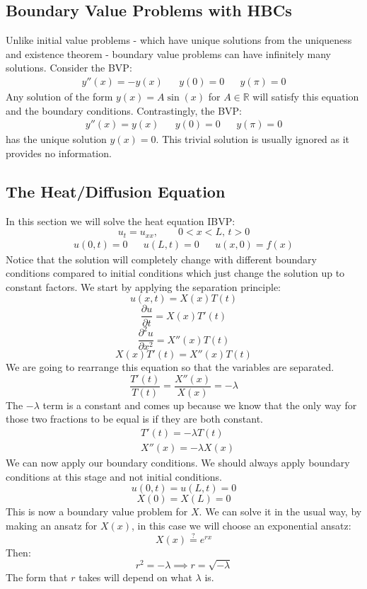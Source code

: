 \documentclass[12pt]{article}
\newcommand{\pf}[2]{\frac{\partial #1}{\partial #2}}
\begin{document}
\subsection{Boundary Value Problems with HBCs}
Unlike initial value problems - which have unique solutions from the uniqueness and existence theorem - boundary value problems can have infinitely many solutions. Consider the BVP:
\begin{align*}
    y''(x)=-y(x) && y(0)=0 && y(\pi)=0
\end{align*}
Any solution of the form \(y(x)=A\sin(x)\) for \(A\in\mathbb{R}\) will satisfy this equation and the boundary conditions. Contrastingly, the BVP:
\begin{align*}
    y''(x)=y(x) && y(0)=0 && y(\pi)=0
\end{align*}
has the unique solution \(y(x)=0\). This trivial solution is usually ignored as it provides no information.
\subsection{The Heat/Diffusion Equation}
In this section we will solve the heat equation IBVP:
\[u_t=u_{xx},\qquad 0<x<L,\,t>0\]
\begin{align*}
    u(0,t)=0 && u(L,t)=0 && u(x,0)=f(x)
\end{align*}
Notice that the solution will completely change with different boundary conditions compared to initial conditions which just change the solution up to constant factors. We start by applying the separation principle:
\[u(x,t)=X(x)T(t)\]
\[\pf{u}{t}=X(x)T'(t)\]
\[\pf{^2u}{x^2}=X''(x)T(t)\]
\[X(x)T'(t)=X''(x)T(t)\]
We are going to rearrange this equation so that the variables are separated.
\[\frac{T'(t)}{T(t)}=\frac{X''(x)}{X(x)}=-\lambda\]
The \(-\lambda\) term is a constant and comes up because we know that the only way for those two fractions to be equal is if they are both constant.
\begin{align*}
    &T'(t)=-\lambda T(t) \\
    &X''(x)=-\lambda X(x)
\end{align*}
We can now apply our boundary conditions. We should always apply boundary conditions at this stage and not initial conditions.
\[u(0,t)=u(L,t)=0\]
\[X(0)=X(L)=0\]
This is now a boundary value problem for \(X\). We can solve it in the usual way, by making an ansatz for \(X(x)\), in this case we will choose an exponential ansatz:
\[X(x)\overset{?}{=}e^{rx}\]
Then:
\[r^2=-\lambda\implies r=\sqrt{-\lambda}\]
The form that \(r\) takes will depend on what \(\lambda\) is.
\end{document}
